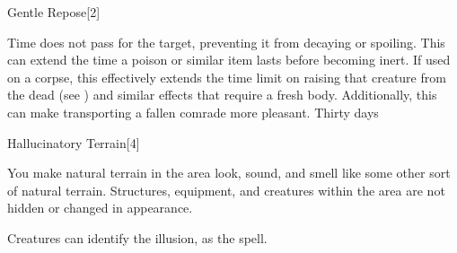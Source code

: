 \begin{spellsection}{Gentle Repose}[2]
    \begin{spellheader}
    \end{spellheader}
    \begin{spellcontent}
        \begin{spelltargetinginfo}
        \end{spelltargetinginfo}
        \begin{spelleffects}
            \spelleffect Time does not pass for the target, preventing it from decaying or spoiling. This can extend the time a poison or similar item lasts before becoming inert. If used on a corpse, this effectively extends the time limit on raising that creature from the dead (see ) and similar effects that require a fresh body. Additionally, this can make transporting a fallen comrade more pleasant.
            \spelldur Thirty days \dismissable
        \end{spelleffects}
    \end{spellcontent}
    \begin{spellfooter}
    \end{spellfooter}
    \begin{spellaugments}
    \end{spellaugments}
\end{spellsection}

\begin{spellsection}{Hallucinatory Terrain}[4]
    \begin{spellheader}
    \end{spellheader}
    \begin{spellcontent}
        \begin{spelltargetinginfo}
        \end{spelltargetinginfo}
        \begin{spelleffects}
            \spelleffect You make natural terrain in the area look, sound, and smell like some other sort of natural terrain. Structures, equipment, and creatures within the area are not hidden or changed in appearance.
            \spelldur \durext \dismissable
        \end{spelleffects}
    \end{spellcontent}
    \begin{spellfooter}
        \spellnotes Creatures can identify the illusion, as the  spell.
    \end{spellfooter}
    \begin{spellaugments}
    \end{spellaugments}
\end{spellsection}

